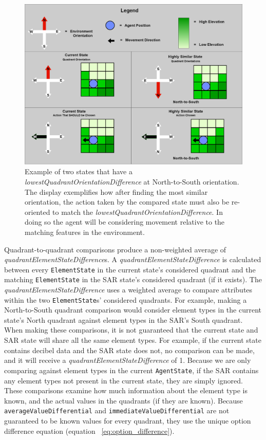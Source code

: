 \begin{figure}[!htb]
  \includegraphics[width=1.0\columnwidth]{Figures/oriented_movement_example.png}
  \caption{Example of two states that have a \textit{lowestQuadrantOrientationDifference} at North-to-South orientation. The display exemplifies how after finding the most similar orientation, the action taken by the compared state must also be re-oriented to match the \textit{lowestQuadrantOrientationDifference}. In doing so the agent will be considering movement relative to the matching features in the environment.}
  \label{fig:oriented_movement_example}
\end{figure}

Quadrant-to-quadrant comparisons produce a non-weighted average of \textit{quadrantElementStateDifference}s.
A \textit{quadrantElementStateDifference} is calculated between every \texttt{ElementState} in the current state's considered quadrant and the matching \texttt{ElementState} in the SAR state's considered quadrant (if it exists).
The \textit{quadrantElementStateDifference} uses a weighted average to compare attributes within the two \texttt{ElementState}s' considered quadrants.
For example, making a North-to-South quadrant comparison would consider element types in the current state's North quadrant against element types in the SAR's South quadrant.
When making these comparisons, it is not guaranteed that the current state and SAR state will share all the same element types.
For example, if the current state contains decibel data and the SAR state does not, no comparison can be made, and it will receive a \textit{quadrantElementStateDifference} of 1.
Because we are only comparing against element types in the current \texttt{AgentState}, if the SAR contains any element types not present in the current state, they are simply ignored.
These comparisons examine how much information about the element type is known, and the actual values in the quadrants (if they are known).
Because \texttt{averageValueDifferential} and \texttt{immediateValueDifferential} are not guaranteed to be known values for every quadrant, they use the unique option difference equation (equation ~\ref{eq:option_difference}).

